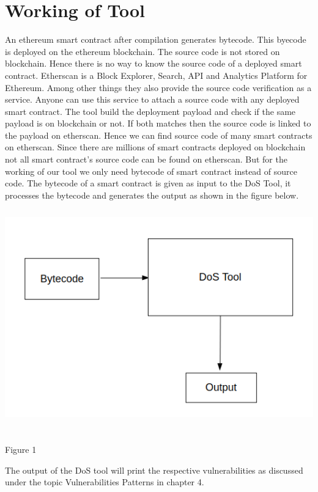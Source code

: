 \documentclass{article}
\begin{document}
\section*{Working of Tool}
An ethereum smart contract after compilation generates bytecode. This byecode is deployed on the ethereum blockchain. The source code is not stored on blockchain. Hence there is no way to know the source code of a deployed smart contract. Etherscan is a Block Explorer, Search, API and Analytics Platform for Ethereum. Among other things they also provide the source code verification as a service. Anyone can use this service to attach a source code with any deployed smart contract. The tool build the deployment payload and check if the same payload is on blockchain or not. If both matches then the source code is linked to the payload on etherscan. Hence we can find source code of many smart contracts on etherscan. Since there are millions of smart contracts deployed on blockchain not all smart contract's source code can be found on etherscan. But for the working of our tool we only need bytecode of smart contract instead of source code. The bytecode of a smart contract is given as input to the DoS Tool, it processes the bytecode and generates the output as shown in the figure below.\\
\includegraphics[width = 15cm, height = 10cm]{images/1.png}
\begin{center}
    Figure 1
\end{center}
The output of the DoS tool will print the respective vulnerabilities as discussed under the topic Vulnerabilities Patterns in chapter 4.
\end{document}
